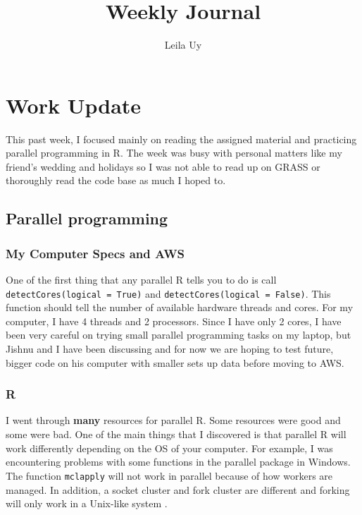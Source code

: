 \documentclass[a4paper,10pt]{article}
\title{Weekly Journal}
\author{Leila Uy}
\begin{document}
\maketitle

% 

\section{Work Update}

This past week, I focused mainly on reading the assigned material and practicing parallel programming in R. The week was busy with personal 
matters like my friend's wedding and holidays so I was not able to read up on GRASS or thoroughly read the code base as much I hoped to.

\subsection{Parallel programming}

\subsubsection{My Computer Specs and AWS}
One of the first thing that any parallel R tells you to do is call \verb|detectCores(logical = True)| and \verb|detectCores(logical = False)|.
This function should tell the number of available hardware threads and cores. For my computer, I have 4 threads and 2 processors. 
Since I have only 2 cores, I have been very careful on trying small parallel programming tasks on my laptop, but Jishnu and I have 
been discussing and for now we are hoping to test future, bigger code on his computer with smaller sets up data before moving to AWS. 

\subsubsection{R}
I went through \textbf{many} resources for parallel R. Some resources were good \cite{gera2020, hallquist2018, martius2020, tinakarimi2020} 
and some were bad. One of the main things that I discovered is that parallel R will work differently depending on the OS of your computer. For example, I was encountering problems with some functions 
in the parallel package in Windows. The function \verb|mclapply| will not work in parallel because of how workers are managed. In addition, 
a socket cluster and fork cluster are different and forking will only work in a Unix-like system \cite{hallquist2018}.
\end{document}

